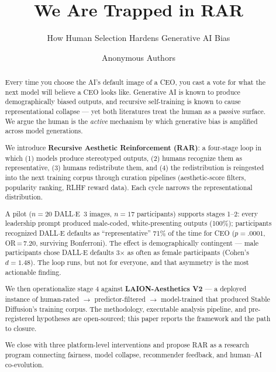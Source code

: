 \documentclass[sigconf,nonacm]{acmart}
\title{We Are Trapped in RAR}
\subtitle{How Human Selection Hardens Generative AI Bias}
\author{Anonymous Authors}
\affiliation{%
  \institution{Anonymous Institution}
  \country{}
}
\begin{document}
\begin{abstract}
Every time you choose the AI's default image of a CEO, you cast a vote for what the next model will believe a CEO looks like. Generative AI is known to produce demographically biased outputs, and recursive self-training is known to cause representational collapse --- yet both literatures treat the human as a passive surface. We argue the human is the \emph{active} mechanism by which generative bias is amplified across model generations.

We introduce \textbf{Recursive Aesthetic Reinforcement (RAR)}: a four-stage loop in which (1) models produce stereotyped outputs, (2) humans recognize them as representative, (3) humans redistribute them, and (4) the redistribution is reingested into the next training corpus through curation pipelines (aesthetic-score filters, popularity ranking, RLHF reward data). Each cycle narrows the representational distribution.

A pilot (\(n=20\) DALL$\cdot$E~3 images, \(n=17\) participants) supports stages 1--2: every leadership prompt produced male-coded, white-presenting outputs (100\%); participants recognized DALL$\cdot$E defaults as ``representative'' 71\% of the time for CEO (\(p=.0001\), OR\,=\,7.20, surviving Bonferroni). The effect is demographically contingent --- male participants chose DALL$\cdot$E defaults 3$\times$ as often as female participants (Cohen's \(d=1.48\)). The loop runs, but not for everyone, and that asymmetry is the most actionable finding.

We then operationalize stage 4 against \textbf{LAION-Aesthetics V2} --- a deployed instance of human-rated $\to$ predictor-filtered $\to$ model-trained that produced Stable Diffusion's training corpus. The methodology, executable analysis pipeline, and pre-registered hypotheses are open-sourced; this paper reports the framework and the path to closure.

We close with three platform-level interventions and propose RAR as a research program connecting fairness, model collapse, recommender feedback, and human--AI co-evolution.
\end{abstract}


\maketitle
\end{document}
